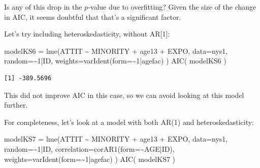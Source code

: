 \documentclass[
  letterpaper,
  DIV=11,
  numbers=noendperiod]{scrreprt}
\newenvironment{Shaded}{\begin{snugshade}}{\end{snugshade}}
\newcommand{\AttributeTok}[1]{\textcolor[rgb]{0.49,0.56,0.16}{#1}}
\newcommand{\DecValTok}[1]{\textcolor[rgb]{0.25,0.63,0.44}{#1}}
\newcommand{\FunctionTok}[1]{\textcolor[rgb]{0.02,0.16,0.49}{#1}}
\newcommand{\NormalTok}[1]{\textcolor[rgb]{0.00,0.44,0.13}{#1}}
\newcommand{\OtherTok}[1]{\textcolor[rgb]{0.00,0.44,0.13}{#1}}
\newcommand{\SpecialCharTok}[1]{\textcolor[rgb]{0.25,0.44,0.63}{#1}}
\begin{document}
Is any of this drop in the \(p\)-value due to overfitting? Given the
size of the change in AIC, it seems doubtful that that's a significant
factor.

Let's try including heteroskedasticity, without AR{[}1{]}:

\begin{Shaded}
\begin{Highlighting}[]
\NormalTok{modelKS6 }\OtherTok{=} \FunctionTok{lme}\NormalTok{(ATTIT }\SpecialCharTok{\textasciitilde{}}\NormalTok{ MINORITY }\SpecialCharTok{+}\NormalTok{ age13 }\SpecialCharTok{+}\NormalTok{ EXPO, }
              \AttributeTok{data=}\NormalTok{nys1,}
              \AttributeTok{random=}\SpecialCharTok{\textasciitilde{}}\DecValTok{1}\SpecialCharTok{|}\NormalTok{ID,}
              \AttributeTok{weights=}\FunctionTok{varIdent}\NormalTok{(}\AttributeTok{form=}\SpecialCharTok{\textasciitilde{}}\DecValTok{1}\SpecialCharTok{|}\NormalTok{agefac) )}
\FunctionTok{AIC}\NormalTok{( modelKS6 )}
\end{Highlighting}
\end{Shaded}

\begin{verbatim}
[1] -389.5696
\end{verbatim}

This did not improve AIC in this case, so we can avoid looking at this
model further.

For completeness, let's look at a model with both AR(1) and
heteroskedasticity:

\begin{Shaded}
\begin{Highlighting}[]
\NormalTok{modelKS7 }\OtherTok{=} \FunctionTok{lme}\NormalTok{(ATTIT }\SpecialCharTok{\textasciitilde{}}\NormalTok{ MINORITY }\SpecialCharTok{+}\NormalTok{ age13 }\SpecialCharTok{+}\NormalTok{ EXPO, }
              \AttributeTok{data=}\NormalTok{nys1,}
              \AttributeTok{random=}\SpecialCharTok{\textasciitilde{}}\DecValTok{1}\SpecialCharTok{|}\NormalTok{ID,}
              \AttributeTok{correlation=}\FunctionTok{corAR1}\NormalTok{(}\AttributeTok{form=}\SpecialCharTok{\textasciitilde{}}\NormalTok{AGE}\SpecialCharTok{|}\NormalTok{ID),}
              \AttributeTok{weights=}\FunctionTok{varIdent}\NormalTok{(}\AttributeTok{form=}\SpecialCharTok{\textasciitilde{}}\DecValTok{1}\SpecialCharTok{|}\NormalTok{agefac) )}
\FunctionTok{AIC}\NormalTok{( modelKS7 )}
\end{Highlighting}
\end{Shaded}
\end{document}
